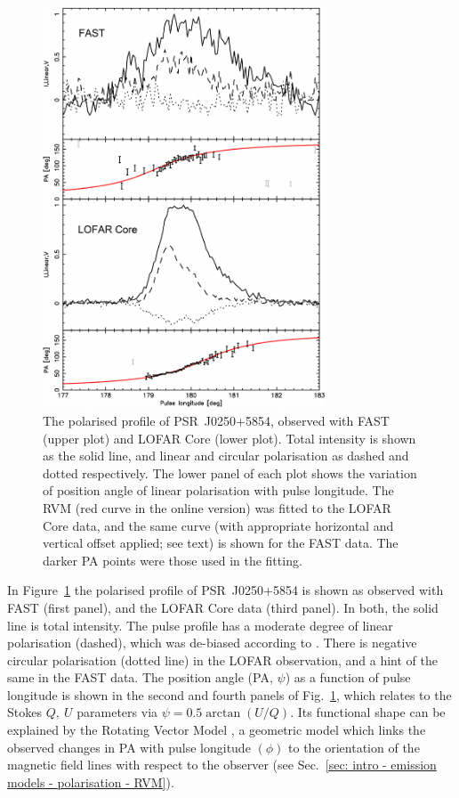 \begin{figure}
    \begin{center}
        \includegraphics[width=0.75\textwidth]{Figures/J0250/polarised_profiles.pdf}
        \caption[The polarised FAST and LOFAR Core profiles of PSR~J0250+5854]{The polarised profile of PSR~J0250+5854, observed with FAST (upper plot) and LOFAR Core (lower plot). Total intensity is shown as the solid line, and linear and circular polarisation as dashed and dotted respectively. The lower panel of each plot shows the variation of position angle of linear polarisation with pulse longitude. The RVM (red curve in the online version) was fitted to the LOFAR Core data, and the same curve (with appropriate horizontal and vertical offset applied; see text) is shown for the FAST data. The darker PA points were those used in the fitting.}
        \label{fig: J0250 - polarised profiles}
    \end{center}
\end{figure}
   
In Figure~\ref{fig: J0250 - polarised profiles} the polarised profile of PSR~J0250+5854 is shown as observed with FAST (first panel), and the LOFAR Core data (third panel). In both, the solid line is total intensity. The pulse profile has a moderate degree of linear polarisation (dashed), which was de-biased according to \citet{WKxx1974}. There is negative circular polarisation (dotted line) in the LOFAR observation, and a hint of the same in the FAST data. The position angle (PA, $\psi$) as a function of pulse longitude is shown in the second and fourth panels of Fig.~\ref{fig: J0250 - polarised profiles}, which relates to the Stokes $Q,\ U$ parameters via $\psi = 0.5 \arctan(U/Q)$. Its functional shape can be explained by the Rotating Vector Model \citep[RVM;][]{RCxx1969}, a geometric model which links the observed changes in PA with pulse longitude $(\phi)$ to the orientation of the magnetic field lines with respect to the observer (see Sec.~\ref{sec: intro - emission models - polarisation - RVM}).


